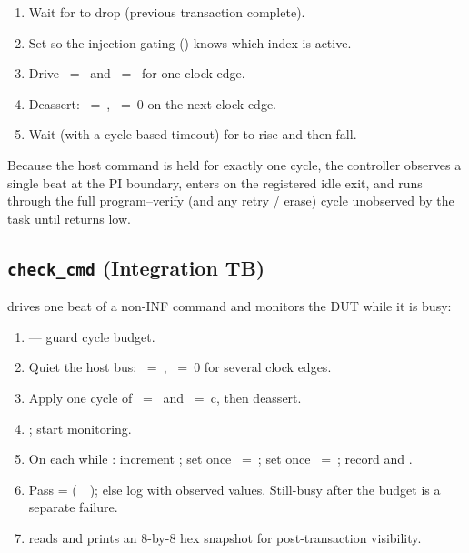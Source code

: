 \begin{enumerate}
    \item Wait for  to drop (previous transaction complete).
    \item Set  so the injection gating
          () knows which index is active.
    \item Drive ~=~
          and ~=~ for one clock edge.
    \item Deassert: ~=~,
          ~=~0 on the next clock edge.
    \item Wait (with a cycle-based timeout) for  to rise
          and then fall.
\end{enumerate}

Because the host command is held for exactly one cycle, the controller
observes a single  beat at the PI boundary, enters
 on the registered idle exit, and runs through the
full program--verify (and any retry / erase) cycle unobserved by the
task until  returns low.

\subsection{\texttt{check\_cmd} (Integration TB)}
\label{app:tb-checkcmd}

 drives one beat of a non-INF command and monitors the
DUT while it is busy:

\begin{enumerate}
    \item {} --- guard cycle budget.
    \item Quiet the host bus: ~=~,
          ~=~0 for several clock edges.
    \item Apply one cycle of ~=~
          and ~=~c, then deassert.
    \item {}; start monitoring.
    \item On each  while :
          increment ; set  once
          ~=~; set 
          once ~=~;
          record  and .
    \item Pass = (~\sv{\&\&}~); else log
           with observed values. Still-busy after the budget is
          a separate failure.
    \item {} reads
           and prints an 8-by-8
          hex snapshot for post-transaction visibility.
\end{enumerate}

